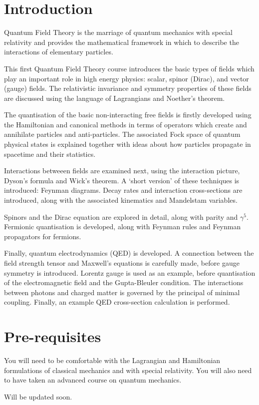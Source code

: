 \documentclass[a4paper,11pt]{article}
\begin{document}
	\maketitlepage
	\preliminaries

	\section*{Introduction}
	
	\noindent Quantum Field Theory is the marriage of quantum mechanics with special relativity and provides the mathematical framework in which to describe the interactions of elementary particles.

	\noindent This first Quantum Field Theory course introduces the basic types of fields which play an important role in high energy physics: scalar, spinor (Dirac), and vector (gauge) fields. The relativistic invariance and symmetry properties of these fields are discussed using the language of Lagrangians and Noether’s theorem.

	\noindent The quantisation of the basic non-interacting free fields is firstly developed using the Hamiltonian and canonical methods in terms of operators which create and annihilate particles and anti-particles. The associated Fock space of quantum physical states is explained together with ideas about how particles propagate in spacetime and their statistics.

	\noindent Interactions betweeen fields are examined next, using the interaction picture, Dyson’s formula and Wick’s theorem. A ‘short version’ of these techniques is introduced: Feynman diagrams. Decay rates and interaction cross-sections are introduced, along with the associated kinematics and Mandelstam variables.

	\noindent Spinors and the Dirac equation are explored in detail, along with parity and $\gamma^{5}$. Fermionic quantisation is developed, along with Feynman rules and Feynman propagators for fermions.

	\noindent Finally, quantum electrodynamics (QED) is developed. A connection between the field strength tensor and Maxwell’s equations is carefully made, before gauge symmetry is introduced. Lorentz gauge is used as an example, before quantisation of the electromagnetic field and the Gupta-Bleuler condition. The interactions between photons and charged matter is governed by the principal of minimal coupling. Finally, an example QED cross-section calculation is performed.

	\section*{Pre-requisites}

	You will need to be comfortable with the Lagrangian and Hamiltonian formulations of classical mechanics and with special relativity. You will also need to have taken an advanced course on quantum mechanics.

	\newpage
	\tableofcontents
	\newpage
	\maintext
	
	Will be updated soon.
	
\end{document}
